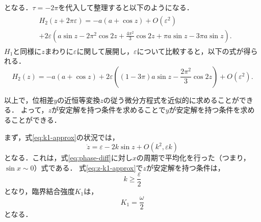 \documentclass[../main]{subfiles}
\begin{document}
    となる．$\tau=-2\pi$を代入して整理すると以下のようになる．
    \begin{align}
        \begin{split}
            &H_2(z+2\pi\varepsilon )=-a(a+\cos z)+O(\varepsilon^2)\\
            &+2\varepsilon\left( a\sin z-2\pi^2\cos2 z+\frac{4\pi^2}{3} \cos 2 z+\pi a\sin z-3\pi a\sin z\right).
        \end{split}
    \end{align}
    $H_1$と同様に$z$まわりに$\varepsilon$に関して展開し，$\varepsilon$について比較すると，以下の式が得られる．
    \begin{equation}
        \label{eq:nit-H2}
        H_2(z)=-a(a+\cos z)+2\varepsilon\left( (1-3\pi)a\sin z-\frac{2\pi^2}{3} \cos 2 z\right)+O(\varepsilon^2).
    \end{equation}

    以上で，位相差$y$の近恒等変換$z$の従う微分方程式を近似的に求めることができる．
    よって，$z$が安定解を持つ条件を求めることで$y$が安定解を持つ条件を求めることができる．
    
    まず，式\eqref{eq:k1-approx}の状況では，
    \begin{equation}
        \dot{z}=\varepsilon-2k\sin z+O(k^2,\varepsilon k)
        \label{eq:z-k1-approx}
    \end{equation}
    となる．これは，式\eqref{eq:phase-diff}に対し$x$の周期で平均化を行った（つまり，$\sin x\sim 0$）式である．
    式\eqref{eq:z-k1-approx}で$z$が安定解を持つ条件は，
    \begin{equation}
        k\geq\frac{\varepsilon}{2}
    \end{equation}
    となり，臨界結合強度$K_1$は，
    \begin{equation}
        \label{eq:K1-approx}
        K_1=\frac{\omega}{2}
    \end{equation}
    となる．
\end{document}

